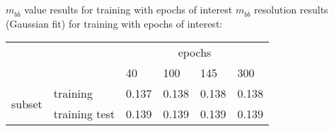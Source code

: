 \begin{frame}{${m_{b\bar{b}}}$ value results for training with epochs of interest}
${m_{b\bar{b}}}$ resolution results (Gaussian fit) for training with epochs of interest:
\begin{table}[h]
\begin{tabular}{ll|llll|}
\cline{3-6}
&&\multicolumn{4}{c|}{epochs}\\
\cline{3-6}
&&40&100&145&300\\
\hline
\multicolumn{1}{|l|}{\multirow{2}{*}{subset}} &training&0.137& 0.138&0.138&0.138    \\
\multicolumn{1}{|l|}{}                        &training test&0.139&0.139&0.139&0.139\\
\hline
\end{tabular}
\end{table}
\end{frame}


